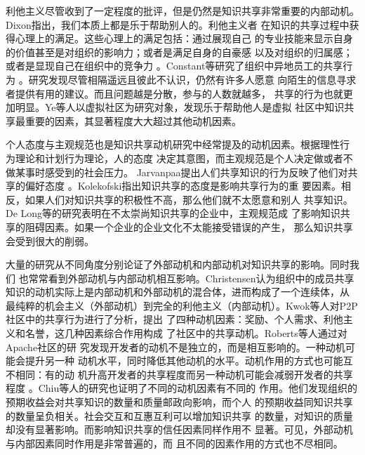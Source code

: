 \documentclass[12pt,a4paper,cs4size]{ctexart}
\begin{document}
利他主义尽管收到了一定程度的批评，但是仍然是知识共享非常重要的内部动机。
Dixon指出，我们本质上都是乐于帮助别人的\cite{dixon2000ckc}。利他主义者
在知识的共享过程中获得心理上的满足。这些心理上的满足包括：通过展现自己
的专业技能来显示自身的价值甚至是对组织的影响力；或者是满足自身的自豪感
以及对组织的归属感；或者是显现自己在组织中的竞争力
\cite{443078119941201}。Constant等研究了组织中异地员工的共享行为
\cite{44348771996}。研究发现尽管相隔遥远且彼此不认识，仍然有许多人愿意
向陌生的信息寻求者提供有用的建议。而且问题越是分散，参与的人数就越多，
共享的行为也就更加明显。Ye等人以虚拟社区为研究对象，发现乐于帮助他人是虚拟
社区中知识共享最重要的因素，其显著程度大大超过其他动机因素\cite{Ye2006}。

个人态度与主观规范也是知识共享动机研究中经常提及的动机因素。根据理性行
为理论\cite{fishbein1975bai}和计划行为理论\cite{Ajzenbw2002}，人的态度
决定其意图，而主观规范是个人决定做或者不做某事时感受到的社会压力。
Jarvanpaa提出人们共享知识的行为反映了他们对共享的偏好态度
\cite{Jarvenpaaee2000}。Kolekofski指出知识共享的态度是影响共享行为的重
要因素。相反，如果人们对知识共享的积极性不高，那么他们就不太愿意和别人
共享知识\cite{cabrera2002ksd}。De Long等的研究表明在不太崇尚知识共享的企业中，主观规范成
了影响知识共享的阻碍因素\cite{DeLong2000}。如果一个企业的企业文化不太能接受错误的产生，
那么知识共享会受到很大的削弱。

大量的研究从不同角度分别论证了外部动机和内部动机对知识共享的影响。同时我们
也常常看到外部动机与内部动机相互影响。Christensen认为组织中的成员共享
知识的动机实际上是内部动机和外部动机的混合体，进而构成了一个连续体，从
最纯粹的机会主义（外部动机）到完全的利他主义（内部动机）\cite{Christensen2005}。Kwok等人对P2P社区中的共享行为进行了分析，提出
了四种动机因素：奖励、个人需求、利他主义和名誉，这几种因素综合作用构成
了社区中的共享动机\cite{kwok2004ksc}。Roberts等人通过对Apache社区的研
究发现开发者的动机不是独立的，而是相互影响的。一种动机可能会提升另一种
动机水平，同时降低其他动机的水平。动机作用的方式也可能互不相同：有的动
机升高开发者的共享程度而另一种动机可能会减弱开发者的共享程度
\cite{2151758320060701}。Chiu等人的研究也证明了不同的动机因素有不同的
作用。他们发现组织的预期收益会对共享知识的数量和质量邮政向影响，而个人
的预期收益同知识共享的数量呈负相关。社会交互和互惠互利可以增加知识共享
的数量，对知识的质量却没有显著影响。而影响知识共享的信任因素同样作用不
显著\cite{Chiu2006}。可见，外部动机与内部因素同时作用是非常普遍的，而
且不同的因素作用的方式也不尽相同。
\end{document}
